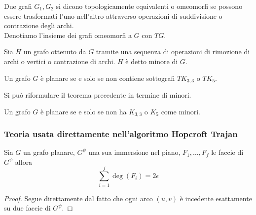 \begin{definizione}
    Due grafi \(G_1,G_2\) si dicono topologicamente equivalenti o omeomorfi se possono essere trasformati l'uno nell'altro attraverso operazioni di suddivisione o contrazione degli archi.
    \\ Denotiamo l'insieme dei grafi omeomorfi a \(G\) con \(TG\).
\end{definizione}

\begin{definizione}[Minore]
    Sia \(H\) un grafo ottenuto da \(G\) tramite una sequenza di operazioni di rimozione di archi o vertici o contrazione di archi. \(H\) è detto minore di \(G\).
\end{definizione}

\begin{teorema}
    Un grafo \(G\) è planare se e solo se non contiene sottografi \(TK_{3,3}\) o \(TK_5\).
\end{teorema}
\noindent Si può riformulare il teorema precedente in termine di minori.
\begin{teorema}
    Un grafo \(G\) è planare se e solo se non ha \(K_{3,3}\) o \(K_5\) come minori.
\end{teorema}

\subsubsection{Teoria usata direttamente nell'algoritmo Hopcroft Trajan}

\begin{definizione}
\end{definizione}

\begin{lemma}\label{gradifaccie}
    Sia \(G\) un grafo planare, \(G^\psi\) una sua immersione nel piano, \(F_1, \dots, F_f\) le faccie di \(G^\psi\) allora
    \begin{equation} 
        \sum_{i=1}^f \deg(F_i) = 2\epsilon
    \end{equation}
\end{lemma}
\begin{proof}
    Segue direttamente dal fatto che ogni arco \((u,v)\) è incedente esattamente su due faccie di \(G^\psi\).
\end{proof}

